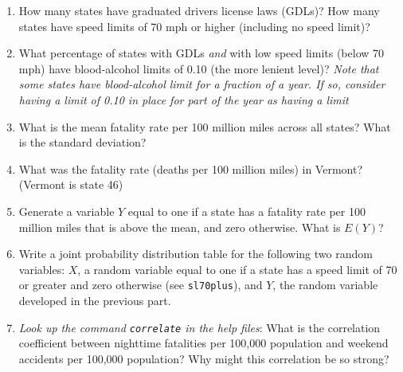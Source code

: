 \documentclass[
]{article}
\begin{document}
\begin{enumerate}
\def\labelenumi{\arabic{enumi}.}
\item
  How many states have graduated drivers license laws (GDLs)? How many
  states have speed limits of 70 mph or higher (including no speed
  limit)?
\item
  What percentage of states with GDLs \emph{and} with low speed limits
  (below 70 mph) have blood-alcohol limits of 0.10 (the more lenient
  level)? \emph{Note that some states have blood-alcohol limit for a
  fraction of a year. If so, consider having a limit of 0.10 in place
  for part of the year as having a limit}
\item
  What is the mean fatality rate per 100 million miles across all
  states? What is the standard deviation?
\item
  What was the fatality rate (deaths per 100 million miles) in Vermont?
  (Vermont is state 46)
\item
  Generate a variable \(Y\) equal to one if a state has a fatality rate
  per 100 million miles that is above the mean, and zero otherwise. What
  is \(E(Y)\)?
\item
  Write a joint probability distribution table for the following two
  random variables: \(X\), a random variable equal to one if a state has
  a speed limit of 70 or greater and zero otherwise (see
  \texttt{sl70plus}), and \(Y\), the random variable developed in the
  previous part.
\item
  \emph{Look up the command \texttt{correlate} in the help files}: What
  is the correlation coefficient between nighttime fatalities per
  100,000 population and weekend accidents per 100,000 population? Why
  might this correlation be so strong?
\end{enumerate}
\end{document}
